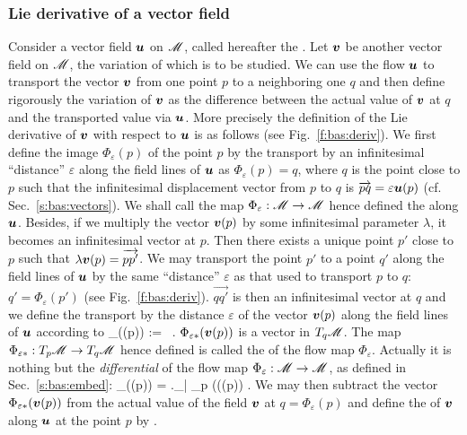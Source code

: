 \subsubsection{Lie derivative of a vector field} \label{s:bas:Lie_der_vector}

Consider a vector field $\bm{u}$ on $\mathscr{M}$, called hereafter the .
Let $\bm{v}$ be another vector field on $\mathscr{M}$, the variation of which is to be studied.
We can use the flow $\bm{u}$ to transport the vector $\bm{v}$ from one point $p$ to
a neighboring one $q$ and then define rigorously the variation of $\bm{v}$
as the difference between the actual value of $\bm{v}$ at $q$ and the transported
value via $\bm{u}$. More precisely the definition of the Lie derivative of
$\bm{v}$ with respect to $\bm{u}$ is as follows (see Fig.~\ref{f:bas:deriv}).
We first define the image $\Phi_\varepsilon(p)$ of the point $p$ by the transport by an infinitesimal ``distance'' $\varepsilon$ along the field lines of $\bm{u}$ as
$\Phi_\varepsilon(p)=q$, where $q$ is the point close to $p$ such that
the infinitesimal displacement vector from $p$ to $q$ is
$\overrightarrow{pq}=\varepsilon\bm{u}(p)$ (cf. Sec.~\ref{s:bas:vectors}).
We shall call the map $\Phi_\varepsilon:\mathscr{M}\rightarrow \mathscr{M}$ hence defined
the  along $\bm{u}$.
Besides, if we multiply the vector $\bm{v}(p)$ by
some infinitesimal parameter $\lambda$, it becomes an infinitesimal vector at $p$.
Then there exists a unique point $p'$ close to $p$ such that
$\lambda\bm{v}(p)=\overrightarrow{pp'}$.
We may transport the point $p'$ to a point $q'$ along the field lines of
$\bm{u}$ by the same ``distance'' $\varepsilon$ as that used to transport
$p$ to $q$: $q'=\Phi_\varepsilon(p')$ (see Fig.~\ref{f:bas:deriv}). $\overrightarrow{qq'}$ is then an
infinitesimal vector at $q$ and we
define the transport by the distance $\varepsilon$ of the vector $\bm{v}(p)$
along the field lines of $\bm{u}$ according to
\be \label{e:bas:def_Phi_eps}
    \Phi_{\veps*}((p)) :=  \, .
\ee
$\Phi_{\varepsilon*}(\bm{v}(p))$ is a vector in $T_q\mathscr{M}$.
The map $\Phi_{\varepsilon*}: T_p\mathscr{M} \rightarrow T_q\mathscr{M}$
hence defined is called the 
of the flow map $\Phi_\varepsilon$. Actually it is nothing but
the \emph{differential}
of the flow map $\Phi_\varepsilon: \mathscr{M} \rightarrow \mathscr{M}$,
as defined in Sec.~\ref{s:bas:embed}:
\be
    \Phi_{\veps*}((p)) = \left.\D\Phi_\varepsilon \right| _p (((p)) .
\ee
We may then subtract the vector $\Phi_{\varepsilon*}(\bm{v}(p))$ from the
actual value of the field $\bm{v}$ at $q=\Phi_\varepsilon(p)$ and define the
of $\bm{v}$ along $\bm{u}$ at the point $p$ by
\be \label{e:bas:def_Lie_der}
    .
\ee

